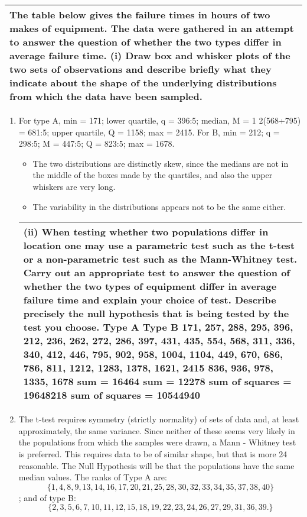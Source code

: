 \documentclass[a4paper,12pt]{article}
\begin{document}
\begin{table}[ht!]
 \centering
 \begin{tabular}{|p{15cm}|}
 \hline  
The table below gives the failure times in hours of two makes of equipment. The data were gathered in an attempt to answer the question of whether  the two types differ in average failure time.
(i) Draw box and whisker plots of the two sets of observations and describe briefly what they indicate about the shape of the underlying distributions from which the data have been sampled.
\\ \hline
  \end{tabular}
\end{table}


\begin{enumerate}
\item For type A, min = 171; lower quartile, q = 396:5; median, M = 1
2(568+795) =
681:5; upper quartile, Q = 1158; max = 2415.
For B, min = 212; q = 298:5; M = 447:5; Q = 823:5; max = 1678.

\begin{itemize}
\item The two distributions are distinctly skew, since the medians are not in the
middle of the boxes made by the quartiles, and also the upper whiskers are
very long. 
\item The variability in the distributions appears not to be the same
either.
\end{itemize}


\newpage
\begin{table}[ht!]
 \centering
 \begin{tabular}{|p{15cm}|}
 \hline 
(ii) When testing whether two populations differ in location one may use a parametric test such as the  t-test or a non-parametric test such as the Mann-Whitney test. Carry out an appropriate test to answer the question of whether the two types of equipment differ in average failure time and explain your choice of test. Describe precisely the null hypothesis that is being tested by the test you choose.
Type A Type B
171, 257, 288, 295, 396, 212, 236, 262, 272, 286,
397, 431, 435, 554, 568, 311, 336, 340, 412, 446,
795, 902, 958, 1004, 1104, 449, 670, 686, 786, 811,
1212, 1283, 1378, 1621, 2415 836, 936, 978, 1335, 1678 sum = 16464 sum = 12278 sum of squares = 19648218 sum of squares = 10544940
\\ \hline
  \end{tabular}
\end{table}
\item The t-test requires symmetry (strictly normality) of sets of data and, at least
approximately, the same variance. Since neither of these seems very likely
in the populations from which the samples were drawn, a Mann - Whitney
test is preferred. This requires data to be of similar shape, but that is more
24
reasonable. The Null Hypothesis will be that the populations have the same
median values. The ranks of Type A are: \[\{1, 4, 8, 9, 13, 14, 16, 17, 20, 21,
25, 28, 30, 32, 33, 34, 35, 37, 38, 40\}\]; and of type B: \[\{2, 3, 5, 6, 7, 10, 11, 12,
15, 18, 19, 22, 23, 24, 26, 27, 29, 31, 36, 39.\}\]


\end{enumerate}
\end{document}
